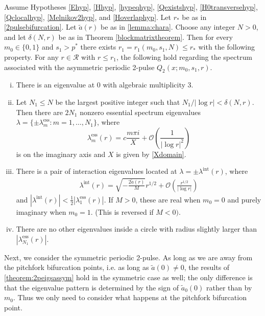 \documentclass[thesis.tex]{subfiles}
\begin{document}
\begin{theorem}\label{theorem:2peigsassym}
Assume Hypotheses \ref{Ehyp}, \ref{Hhyp}, \ref{hypeqhyp}, \ref{Qexistshyp}, \ref{H0transversehyp}, \ref{Qclocalhyp}, \ref{Melnikov2hyp}, and \ref{Hoverlaphyp}. Let $r_*$ be as in \cref{2pulsebifurcation}. Let $\tilde{a}(r)$ be as in \cref{lemma:chara}. Choose any integer $N > 0$, and let $\delta(N,r)$ be as in Theorem \ref{blockmatrixtheorem}. Then for every $m_0 \in \{0, 1\}$ and $s_1 > p^*$ there exists $r_1 = r_1(m_0, s_1, N) \leq r_*$ with the following property. For any $r \in \mathcal{R}$ with $r \leq r_1$, the following hold regarding the spectrum associated with the asymmetric periodic 2-pulse $Q_2(x; m_0, s_1, r)$.

\begin{enumerate}[(i)]
\item There is an eigenvalue at 0 with algebraic multiplicity 3. 
\item Let $N_1 \leq N$ be the largest positive integer such that $N_1/|\log r| < \delta(N,r)$. Then there are $2N_1$ nonzero essential spectrum eigenvalues $\lambda = \{ \pm \lambda_m^{\text{ess}} : m = 1, \dots, N_1 \}$, where
\[
\lambda_m^{\text{ess}}(r) = c \frac{m \pi i}{X}+  \mathcal{O}\left( \frac{1}{|\log r|^2} \right)
\]
is on the imaginary axis and $X$ is given by \cref{Xdomain}.

\item There is a pair of interaction eigenvalues located at $\lambda = \pm \lambda^{\text{int}}(r)$, where
	\begin{align*}
	\lambda^{\text{int}}(r) =  \sqrt{-\frac{2 \tilde{a}(r)}{M}}r^{1/2} + \mathcal{O}\left( \frac{r^{1/2}}{|\log r|} \right) 
	\end{align*}
and $|\lambda^{\text{int}}(r)| < \frac{1}{2}|\lambda_1^{\text{ess}}(r)|$. If $M > 0$, these are real when $m_0 = 0$ and purely imaginary when $m_0 = 1$. (This is reversed if $M < 0)$. 
\item There are no other eigenvalues inside a circle with radius slightly larger than $|\lambda_{N_1}^{\text{ess}}(r)|$.
\end{enumerate}
\end{theorem}

Next, we consider the symmetric periodic 2-pulse. As long as we are away from the pitchfork bifurcation points, i.e. as long as $\tilde{a}(0) \neq 0$, the results of \cref{theorem:2peigsassym} hold in the symmetric case as well; the only difference is that the eigenvalue pattern is determined by the sign of $\tilde{a}_0(0)$ rather than by $m_0$. Thus we only need to consider what happens at the pitchfork bifurcation point.
\end{document}
